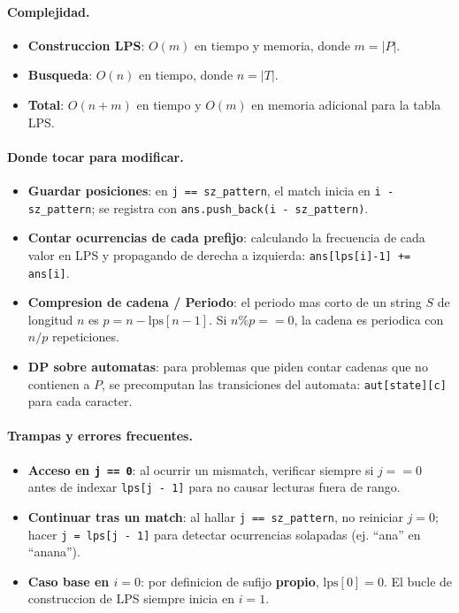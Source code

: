 \paragraph{Complejidad.}
\begin{itemize}\setlength\itemsep{0pt}
	\item \textbf{Construccion LPS}: $O(m)$ en tiempo y memoria, donde $m = |P|$.
	\item \textbf{Busqueda}: $O(n)$ en tiempo, donde $n = |T|$.
	\item \textbf{Total}: $O(n + m)$ en tiempo y $O(m)$ en memoria adicional para la tabla LPS.
\end{itemize}

\paragraph{Donde tocar para modificar.}
\begin{itemize}\setlength\itemsep{0pt}
	\item \textbf{Guardar posiciones}: en \verb|j == sz_pattern|, el match inicia en \verb|i - sz_pattern|; se registra con \verb|ans.push_back(i - sz_pattern)|.
	\item \textbf{Contar ocurrencias de cada prefijo}: calculando la frecuencia de cada valor en LPS y propagando de derecha a izquierda: \verb|ans[lps[i]-1] += ans[i]|.
	\item \textbf{Compresion de cadena / Periodo}: el periodo mas corto de un string $S$ de longitud $n$ es $p = n - \text{lps}[n-1]$. Si $n \% p == 0$, la cadena es periodica con $n/p$ repeticiones.
	\item \textbf{DP sobre automatas}: para problemas que piden contar cadenas que no contienen a $P$, se precomputan las transiciones del automata: \verb|aut[state][c]| para cada caracter.
\end{itemize}

\paragraph{Trampas y errores frecuentes.}
\begin{itemize}\setlength\itemsep{0pt}
	\item \textbf{Acceso en \texttt{j == 0}}: al ocurrir un mismatch, verificar siempre si $j == 0$ antes de indexar \verb|lps[j - 1]| para no causar lecturas fuera de rango.
	\item \textbf{Continuar tras un match}: al hallar \verb|j == sz_pattern|, no reiniciar $j = 0$; hacer \verb|j = lps[j - 1]| para detectar ocurrencias solapadas (ej. ``ana'' en ``anana'').
	\item \textbf{Caso base en $i=0$}: por definicion de sufijo \textbf{propio}, $\text{lps}[0] = 0$. El bucle de construccion de LPS siempre inicia en $i = 1$.
\end{itemize}

